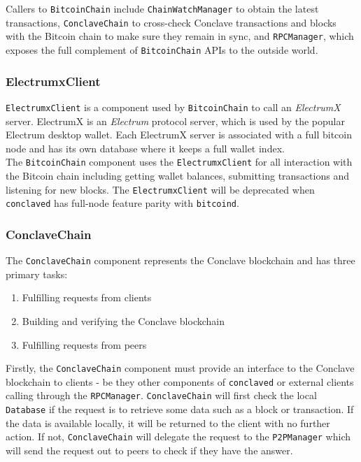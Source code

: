 \documentclass{report}
\begin{document}
			Callers to \texttt{BitcoinChain} include \texttt{ChainWatchManager} to obtain the latest transactions, \texttt{ConclaveChain} to cross-check Conclave transactions and blocks with the Bitcoin chain to make sure they remain in sync, and \texttt{RPCManager}, which exposes the full complement of \texttt{BitcoinChain} APIs to the outside world. 
			
			\subsubsection{ElectrumxClient}
			\texttt{ElectrumxClient} is a component used by \texttt{BitcoinChain} to call an \textit{ElectrumX} \cite{electrumx} server. ElectrumX is an \textit{Electrum} protocol server, which is used by the popular Electrum desktop wallet. Each ElectrumX server is associated with a full bitcoin node and has its own database where it keeps a full wallet index. \\
			
			The \texttt{BitcoinChain} component uses the \texttt{ElectrumxClient}  for all interaction with the Bitcoin chain including getting wallet balances, submitting transactions and listening for new blocks. The \texttt{ElectrumxClient} will be deprecated when \texttt{conclaved} has full-node feature parity with \texttt{bitcoind}.
			
			\subsubsection{ConclaveChain}
			The \texttt{ConclaveChain} component represents the Conclave blockchain and has three primary tasks:
			
			\begin{enumerate}
				\item Fulfilling requests from clients
				\item Building and verifying the Conclave blockchain
				\item Fulfilling requests from peers
			\end{enumerate}
			
			Firstly, the \texttt{ConclaveChain} component must provide an interface to the Conclave blockchain to clients - be they other components of \texttt{conclaved} or external clients calling through the \texttt{RPCManager}. \texttt{ConclaveChain} will first check the local \texttt{Database} if the request is to retrieve some data such as a block or transaction. If the data is available locally, it will be returned to the client with no further action. If not, \texttt{ConclaveChain} will delegate the request to the \texttt{P2PManager} which will send the request out to peers to check if they have the answer. \\
			
\end{document}
